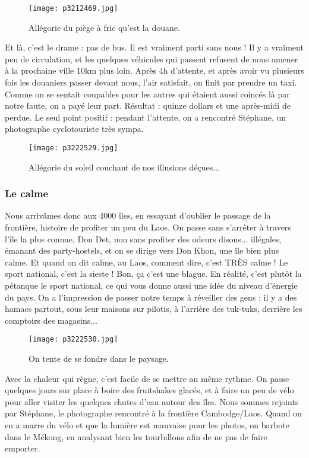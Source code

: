 \documentclass{book}
\begin{document}
\begin{figure}[h]
\centering
\texttt{[image: p3212469.jpg]}
\caption*{Allégorie du piège à fric qu'est la douane.}
\end{figure}

Et là, c'est le drame : pas de bus. Il est vraiment parti sans nous ! Il y a vraiment peu de circulation, et les quelques véhicules qui passent refusent de nous amener à la prochaine ville 10km plus loin. Après 4h d'attente, et après avoir vu plusieurs fois les douaniers passer devant nous, l'air satisfait, on finit par prendre un taxi. Comme on se sentait coupables pour les autres qui étaient aussi coincés là par notre faute, on a payé leur part. Résultat : quinze dollars et une après-midi de perdue. Le seul point positif : pendant l'attente, on a rencontré Stéphane, un photographe cyclotouriste très sympa.


\begin{figure}[h]
\centering
\texttt{[image: p3222529.jpg]}
\caption*{Allégorie du soleil couchant de nos illusions déçues...}
\end{figure}
\subsubsection{Le calme}
Nous arrivâmes donc aux 4000 îles, en essayant d'oublier le passage de la frontière, histoire de profiter un peu du Laos. On passe sans s'arrêter à travers l'île la plus connue, Don Det, non sans profiter des odeurs disons... illégales, émanant des party-hostels, et on se dirige vers Don Khon, une île bien plus calme. Et quand on dit calme, au Laos, comment dire, c'est TRÈS calme ! Le sport national, c'est la sieste ! Bon, ça c'est une blague. En réalité, c'est plutôt la pétanque le sport national, ce qui vous donne aussi une idée du niveau d'énergie du pays. On a l'impression de passer notre temps à réveiller des gens : il y a des hamacs partout, sous leur maisons sur pilotis, à l'arrière des tuk-tuks, derrière les comptoirs des magasins...


\begin{figure}[h]
\centering
\texttt{[image: p3222530.jpg]}
\caption*{On tente de se fondre dans le paysage.}
\end{figure}

Avec la chaleur qui règne, c'est facile de se mettre au même rythme. On passe quelques jours sur place à boire des fruitshakes glacés, et à faire un peu de vélo pour aller visiter les quelques chutes d'eau autour des îles. Nous sommes rejoints par Stéphane, le photographe rencontré à la frontière Cambodge/Laos. Quand on en a marre du vélo et que la lumière est mauvaise pour les photos, on barbote dans le Mékong, en analysant bien les tourbillons afin de ne pas de faire emporter.
\end{document}
